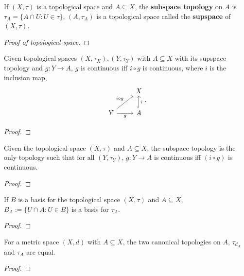 \documentclass[../Year2.tex]{subfiles}
\begin{document}
\begin{definition}[Subspace]
    If $(X,\tau)$ is a topological space and $A\subseteq X$, the \textbf{subspace topology} on $A$ is $\tau_A=\{A\cap U: U\in\tau\}$, $(A,\tau_A)$ is a topological space called the \textbf{supspace} of $(X,\tau)$.
    \begin{proof}[Proof of topological space]
        
    \end{proof}
\end{definition}

\begin{proposition}
    Given topological spaces $(X,\tau_X), (Y,\tau_Y)$ with $A\subseteq X$ with its supspace topology and $g:Y\rightarrow A$, $g$ is continuous iff $i\circ g$ is continuous, where $i$ is the inclusion map, \[
        \begin{tikzcd}
            & X \\
            Y \arrow[ur, "i\circ g"] \arrow[r, swap, "g"] & A \arrow[u, swap, hook, "i"]
        \end{tikzcd}
        \black{.}
    \]
    \begin{proof}
        
    \end{proof}
\end{proposition}

\begin{theorem}
    Given the topological space $(X,\tau)$ and $A\subseteq X$, the subspace topology is the only topology such that for all $(Y,\tau_Y)$, $g:Y\rightarrow A$ is continuous iff $(i\circ g)$ is continuous.
    \begin{proof}
        
    \end{proof}
\end{theorem}

\begin{lemma}
    If $B$ is a basis for the topological space $(X,\tau)$ and $A\subseteq X$, $B_A:=\{U\cap A:U\in B\}$ is a basis for $\tau_A$.
    \begin{proof}
        
    \end{proof}
\end{lemma}

\begin{proposition}
    For a metric space $(X,d)$ with $A\subseteq X$, the two canonical topologies on $A$, $\tau_{d_A}$ and $\tau_A$ are equal. \begin{proof}
        
    \end{proof}
\end{proposition}
\end{document}
